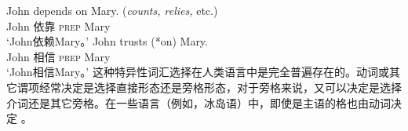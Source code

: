 \begin{exe}
\begin{xlist}[iv.]
\begin{exe}
\begin{xlist}[iv.]
\eal\label{depends-on-ex}
\ex 
\gll John depends on Mary.  (\emph{counts, relies,} etc.)\\
     John 依靠 \textsc{prep} Mary\\
\glt `John依赖Mary。'
\ex 
\gll John trusts (*on) Mary.\\
     John 相信 \textsc{prep} Mary\\
\glt `John相信Mary。' 
\ex 
{}
\zl
这种特异性词汇选择在人类语言中是完全普遍存在的。动词或其它谓项经常决定是选择直接形态还是旁格形态，对于旁格来说，又可以决定是选择介词还是其它旁格。在一些语言（例如，冰岛语）中，即使是主语的格也由动词决定 \citep*{ZMT85a}。


\end{xlist}
\end{exe}
\end{xlist}
\end{exe}
